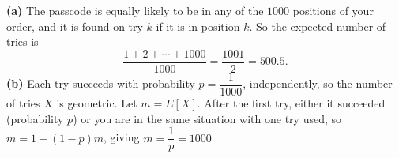 \textbf{(a)} The passcode is equally likely to be in any of the $1000$ positions of your order, and it is found on try $k$ if it is in position $k$. So the expected number of tries is
\[
\dfrac{1+2+\cdots+1000}{1000}=\dfrac{1001}{2}=\boxed{500.5}.
\]
\textbf{(b)} Each try succeeds with probability $p=\dfrac{1}{1000}$, independently, so the number of tries $X$ is geometric. Let $m=E[X]$. After the first try, either it succeeded (probability $p$) or you are in the same situation with one try used, so $m=1+(1-p)m$, giving $m=\dfrac{1}{p}=\boxed{1000}$.

